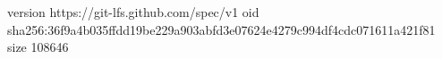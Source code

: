 version https://git-lfs.github.com/spec/v1
oid sha256:36f9a4b035ffdd19be229a903abfd3e07624e4279c994df4cdc071611a421f81
size 108646
